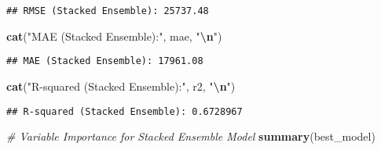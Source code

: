 \documentclass[
]{article}
\newenvironment{Shaded}{\begin{snugshade}}{\end{snugshade}}
\newcommand{\CommentTok}[1]{\textcolor[rgb]{0.56,0.35,0.01}{\textit{#1}}}
\newcommand{\FunctionTok}[1]{\textcolor[rgb]{0.13,0.29,0.53}{\textbf{#1}}}
\newcommand{\NormalTok}[1]{#1}
\newcommand{\SpecialCharTok}[1]{\textcolor[rgb]{0.81,0.36,0.00}{\textbf{#1}}}
\newcommand{\StringTok}[1]{\textcolor[rgb]{0.31,0.60,0.02}{#1}}
\begin{document}
\begin{verbatim}
## RMSE (Stacked Ensemble): 25737.48
\end{verbatim}

\begin{Shaded}
\begin{Highlighting}[]
\FunctionTok{cat}\NormalTok{(}\StringTok{"MAE (Stacked Ensemble):"}\NormalTok{, mae, }\StringTok{"}\SpecialCharTok{\textbackslash{}n}\StringTok{"}\NormalTok{)}
\end{Highlighting}
\end{Shaded}

\begin{verbatim}
## MAE (Stacked Ensemble): 17961.08
\end{verbatim}

\begin{Shaded}
\begin{Highlighting}[]
\FunctionTok{cat}\NormalTok{(}\StringTok{"R{-}squared (Stacked Ensemble):"}\NormalTok{, r2, }\StringTok{"}\SpecialCharTok{\textbackslash{}n}\StringTok{"}\NormalTok{)}
\end{Highlighting}
\end{Shaded}

\begin{verbatim}
## R-squared (Stacked Ensemble): 0.6728967
\end{verbatim}

\begin{Shaded}
\begin{Highlighting}[]
\CommentTok{\# Variable Importance for Stacked Ensemble Model}
\FunctionTok{summary}\NormalTok{(best\_model)}
\end{Highlighting}
\end{Shaded}
\end{document}
